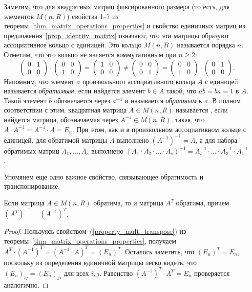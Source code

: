 \begin{remark}\label{rem:matrix_multiplication_properties}
Заметим, что для квадратных матриц фиксированного размера (то есть,
для элементов $M(n,R)$) свойства 1--7 из
теоремы~\ref{thm_matrix_operations_properties} и свойство единичных
матриц из предложения~\ref{prop_identity_matrix} означают, что эти
матрицы образуют ассоциативное кольцо с единицей. Это кольцо $M(n,R)$
называется  порядка $n$.
Отметим, что это кольцо не является коммутативным при $n\geq 2$:
$$
\begin{pmatrix}0 & 1\\0 & 0\end{pmatrix}\cdot
\begin{pmatrix}0 & 0\\1 & 0\end{pmatrix} = 
\begin{pmatrix}1 & 0\\0 & 0\end{pmatrix}\neq
\begin{pmatrix}0 & 0\\0 & 1\end{pmatrix} = 
\begin{pmatrix}0 & 0\\1 & 0\end{pmatrix}\cdot
\begin{pmatrix}0 & 1\\0 & 0\end{pmatrix}.
$$
Напомним, что элемент $a$ произвольного ассоциативного кольца $A$ с
единицей называется {\it обратимым}, если найдется элемент $b\in A$
такой, что $ab=ba=1$ в $A$. Такой элемент $b$ обозначается через
$a^{-1}$ и называется {\it обратным} к $a$. В полном соответствии с
этим, квадратная матрица $A\in M(n,R)$ называется
,
если найдется матрица, обозначаемая через $A^{-1}\in M(n,R)$, такая,
что $A\cdot A^{-1} = A^{-1}\cdot A = E_n$. При этом, как и в
произвольном ассоциативном кольце с единицей, для обратимой матрицы
$A$ выполнено $(A^{-1})^{-1}=A$, а для набора обратимых матриц
$A_1,\dots,A_s$ выполнено $(A_1\cdot A_2\cdot\dots\cdot A_s)^{-1} =
A_s^{-1}\cdot\dots\cdot A_2^{-1}\cdot A_1^{-1}$.
\end{remark}

Упомянем еще одно важное свойство, связывающее обратимость и
транспонирование.

\begin{proposition}
Если матрица $A\in M(n,R)$ обратима, то и матрица $A^T$ обратима,
причем $(A^T)^{-1} = (A^{-1})^T$.
\end{proposition}
\begin{proof}
Пользуясь свойством~(\ref{property_mult_transpose}) из
теоремы~\ref{thm_matrix_operations_properties}, получаем
$A^T\cdot(A^{-1})^T = (A^{-1}\cdot A)^T = (E_n)^T$. Осталось заметить,
что $(E_n)^T=E_n$, поскольку из определения единичной матрицы легко
видеть, что $(E_n)_{ij}=(E_n)_{ji}$ для всех $i,j$. Равенство
$(A^{-1})^T\cdot A^T=E_n$ проверяется аналогично.
\end{proof}

